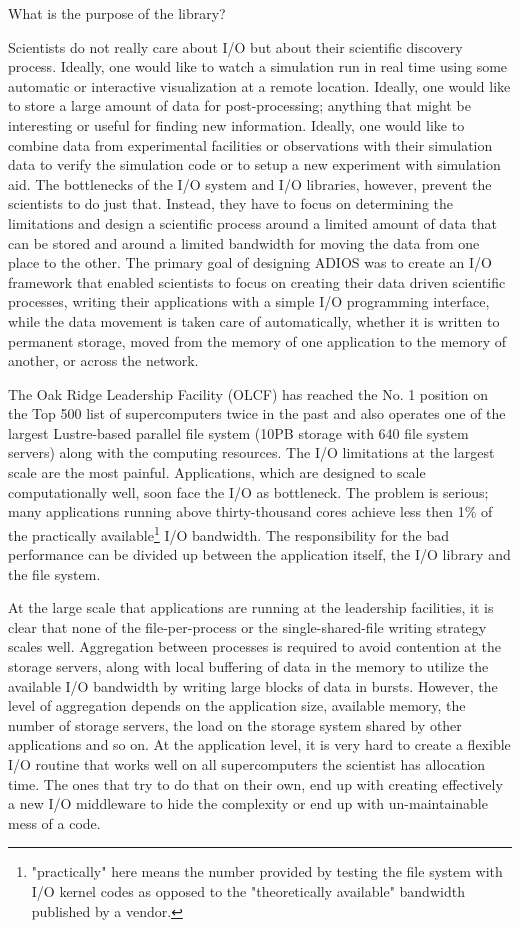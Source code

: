 {\color {red}What is the purpose of the library?}

Scientists do not really care about I/O but about their scientific discovery process. Ideally, one would like to watch a simulation run in real time using some automatic or interactive visualization at a remote location. Ideally, one would like to store a large amount of data for post-processing; anything that might be interesting or useful for finding new information. Ideally, one would like to combine data from experimental facilities or observations with their simulation data to verify the simulation code or to setup a new experiment with simulation aid. The bottlenecks of the I/O system and I/O libraries, however, prevent the scientists to do just that. Instead, they have to focus on determining the limitations and design a scientific process around a limited amount of data that can be stored and around a limited bandwidth for moving the data from one place to the other. The primary goal of designing ADIOS was to create an I/O framework that enabled scientists to focus on creating their data driven scientific processes, writing their applications with a simple I/O programming interface, while the data movement is taken care of automatically, whether it is written to permanent storage, moved from the memory of one application to the memory of another, or across the network.

The Oak Ridge Leadership Facility (OLCF) has reached the No. 1 position on the Top 500 list of supercomputers twice in the past and also operates one of the largest Lustre-based parallel file system (10PB storage with 640 file system servers) along with the computing resources. The I/O limitations at the largest scale are the most painful. Applications, which are designed to scale computationally well, soon face the I/O as bottleneck. The problem is serious; many applications running above thirty-thousand cores achieve less then 1\% of the practically available\footnote{"practically" here means the number provided by testing the file system with I/O kernel codes as opposed to the "theoretically available" bandwidth published by a vendor.}  I/O bandwidth. The responsibility for the bad performance can be divided up between the application itself, the I/O library and the file system. 

At the large scale that applications are running at the leadership facilities, it is clear that none of the file-per-process or the single-shared-file writing strategy scales well. Aggregation between processes is required to avoid contention at the storage servers, along with local buffering of data in the memory to utilize the available I/O bandwidth by writing large blocks of data in bursts. However, the level of aggregation depends on the application size, available memory, the number of storage servers, the load on the storage system shared by other applications and so on. At the application level, it is very hard to create a flexible I/O routine that works well on all supercomputers the scientist has allocation time. The ones that try to do that on their own, end up with creating effectively a new I/O middleware to hide the complexity or end up with un-maintainable mess of a code.

